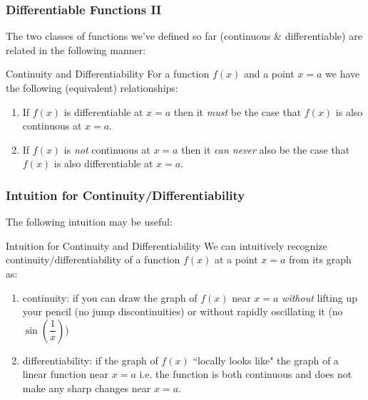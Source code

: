 \documentclass{ltx-talk}
\begin{document}
\begin{frame}
  \frametitle{Differentiable Functions II}
  The two classes of functions we've defined so far 
  \pause (continuous \& differentiable) \pause
  are related in the following manner: \pause

  \begin{alertblock}{Continuity and Differentiability}
    For a function $f(x)$ and a point $x = a$ we have the following (equivalent) relationships: \pause
    \begin{enumerate}
      \item If $f(x)$ is differentiable at $x = a$ \pause
        then it \textit{must} be the case \pause 
        that $f(x)$ is also continuous at $x = a$. \pause
      \item If $f(x)$ is \textit{not} continuous at $x = a$ \pause
        then it \textit{can never} also be the case \pause
        that $f(x)$ is also differentiable at $x = a$.
    \end{enumerate}
  \end{alertblock}
\end{frame}

\begin{frame}
  \frametitle{Intuition for Continuity/Differentiability}
  The following intuition may be useful:

  \begin{alertblock}{Intuition for Continuity and Differentiability}
    We can intuitively recognize continuity/differentiability of a function $f(x)$ at a point $x = a$ from its graph as: \pause
    \begin{enumerate}
      \item continuity: if you can draw the graph of $f(x)$ near $x = a$ \textit{without} lifting up your pencil \pause (no jump discontinuities) \pause or without rapidly oscillating it \pause (no $\sin(\dfrac{1}{x})$) \pause
      \item differentiability: if the graph of $f(x)$ ``locally looks like" the graph of a linear function near $x = a$ \pause i.e. the function is both continuous and does not make any sharp changes near $x = a$.
    \end{enumerate}
  \end{alertblock}
\end{frame}
\end{document}
